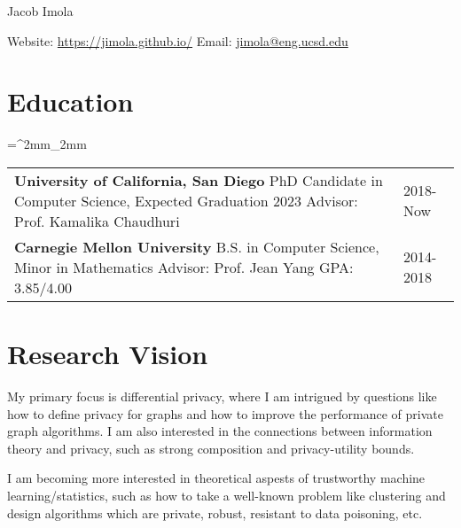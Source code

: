 \documentclass[11pt]{article}
\begin{document}


\centerline{{\Huge Jacob Imola}}
\noindent Website: \href{https://jimola.github.io/}{https://jimola.github.io/} \hfill Email: \href{mailto:jimola@eng.ucsd.edu}{jimola@eng.ucsd.edu}

\section*{Education}
\tabulinesep=^2mm_2mm
\begin{tabu}{X[4, l] X[1, l]}
	\setlength{\extrarowsep}{3mm}
  \textbf{University of California, San Diego} \newline
  PhD Candidate in Computer Science, Expected Graduation 2023 \newline
  Advisor: Prof. Kamalika Chaudhuri 
	&
  2018-Now \\
  \textbf{Carnegie Mellon University} \newline
  B.S. in Computer Science, Minor in Mathematics \newline
  Advisor: Prof. Jean Yang \newline
  GPA: 3.85/4.00
	&
  2014-2018 \\
\end{tabu}

\section*{Research Vision}
My primary focus is differential privacy, where I 
am intrigued by questions like how to define privacy for graphs and how to improve the performance of private graph algorithms.
I am also interested in the connections between information theory and privacy, such as strong composition and privacy-utility bounds.

I am becoming more interested in theoretical aspests of trustworthy machine learning/statistics, such as how to take a well-known 
problem like clustering and design algorithms which are private, robust, resistant to data poisoning, etc.
\end{document}
